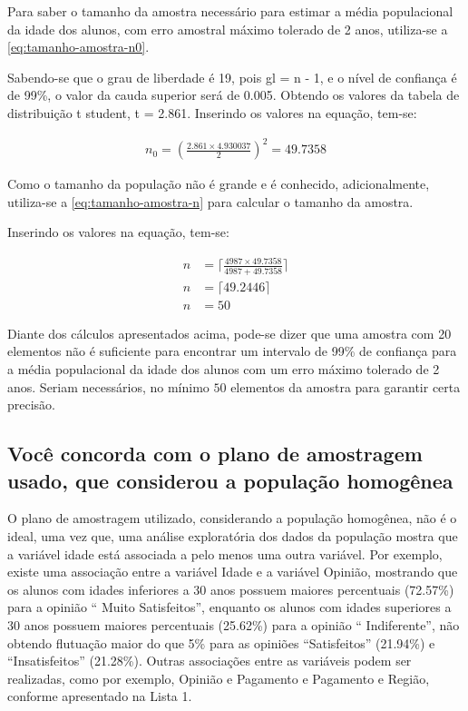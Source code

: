 	Para saber o tamanho da amostra necessário para estimar a média
	populacional da idade dos alunos, com erro amostral máximo tolerado de 2
	anos, utiliza-se a \autoref{eq:tamanho-amostra-n0}.

	Sabendo-se que o grau de liberdade é 19, pois gl = n - 1, e o nível de
	confiança é de 99\%, o valor da cauda superior será de \num{0,005}. Obtendo os
	valores da tabela de distribuição t student, t = \num{2,861}.
	Inserindo os valores na equação, tem-se:

	\begin{align*}
		n_0 = \left (\frac{\num{2,861} \times \num{4,930037}}{2} \right)^2 = \num{49,7358}
	\end{align*}

	Como o tamanho da população não é grande e é conhecido, adicionalmente,
	utiliza-se a \autoref{eq:tamanho-amostra-n} para calcular o tamanho da amostra.

	Inserindo os valores na equação, tem-se:

	\begin{align*}
		n &= \Big\lceil \frac{4987 \times \num{49,7358}}{4987 + \num{49,7358}} \Big\rceil \\
		n &= \lceil \num{49,2446} \rceil \\
		n &= 50
	\end{align*}

	Diante dos cálculos apresentados acima, pode-se dizer que uma amostra
	com 20 elementos não é suficiente para encontrar um intervalo de 99\% de
	confiança para a média populacional da idade dos alunos com um erro
	máximo tolerado de 2 anos. Seriam necessários, no mínimo $50$ elementos da
	amostra para garantir certa precisão. 

\subsection{Você concorda com o plano de amostragem usado, que considerou a população homogênea}
	
	
	O plano de amostragem utilizado, considerando a população homogênea, não é o ideal, 
	uma vez que, uma análise exploratória dos dados da população mostra que a variável idade está associada 
	a pelo menos uma outra variável. Por exemplo, existe uma
	associação entre a variável Idade e a variável Opinião, mostrando que os
	alunos com idades inferiores a 30 anos possuem maiores percentuais
	(\num{72,57}\%) para a opinião `` Muito Satisfeitos'', enquanto os 
    alunos com idades superiores
	a 30 anos possuem maiores percentuais (\num{25,62}\%) para a opinião
    `` Indiferente'', não obtendo flutuação
	maior do que 5\% para as opiniões ``Satisfeitos'' (\num{21,94}\%) 
    e ``Insatisfeitos'' (\num{21,28}\%). Outras associações entre as variáveis podem ser realizadas, como por exemplo, 
       Opinião e Pagamento e Pagamento e Região, conforme apresentado na Lista 1. 

